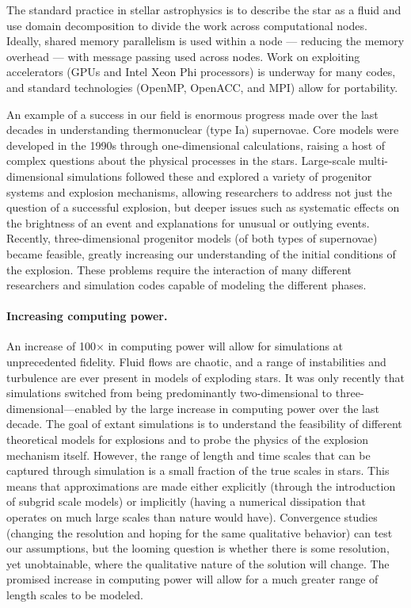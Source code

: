 \documentclass[11pt,twocolumn]{article}
\begin{document}
The standard practice in stellar astrophysics is to describe the star
as a fluid and use domain decomposition to divide the work across
computational nodes.  Ideally, shared memory parallelism is used
within a node --- reducing the memory overhead --- with message
passing used across nodes.  Work on exploiting accelerators (GPUs and
Intel Xeon Phi processors) is underway for many codes, and standard
technologies (OpenMP, OpenACC, and MPI) allow for portability.

An example of a success in our field is enormous progress made over
the last decades in understanding thermonuclear (type Ia) supernovae.
Core models were developed in the 1990s through one-dimensional
calculations, raising a host of complex questions about the physical
processes in the stars.  Large-scale multi-dimensional simulations
followed these and explored a variety of progenitor systems and explosion
mechanisms, allowing researchers to address not just the question of a
successful explosion, but deeper issues such as systematic effects on
the brightness of an event and explanations for unusual or outlying
events.  Recently, three-dimensional progenitor models (of both types
of supernovae) became feasible, greatly increasing our understanding
of the initial conditions of the explosion.  These problems require
the interaction of many different researchers and simulation codes
capable of modeling the different phases.

\paragraph*{Increasing computing power.}

An increase of 100$\times$ in computing power will allow for
simulations at unprecedented fidelity. Fluid flows are chaotic, and a
range of instabilities and turbulence are ever present in models of
exploding stars. It was only recently that simulations switched from
being predominantly two-dimensional to three-dimensional---enabled by
the large increase in computing power over the last decade.  The goal
of extant simulations is to understand the feasibility of different
theoretical models for explosions and to probe the physics of the
explosion mechanism itself.  However, the range of length and time
scales that can be captured through simulation is a small fraction of
the true scales in stars.  This means that approximations are made
either explicitly (through the introduction of subgrid scale models)
or implicitly (having a numerical dissipation that operates on much
large scales than nature would have).  Convergence studies (changing
the resolution and hoping for the same qualitative behavior) can test
our assumptions, but the looming question is whether there is some
resolution, yet unobtainable, where the qualitative nature of the
solution will change.  The promised increase in computing power will
allow for a much greater range of length scales to be modeled.
\end{document}
